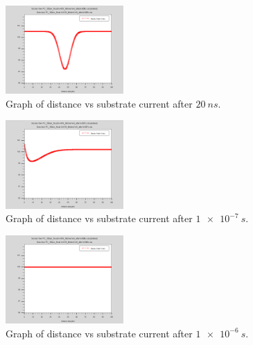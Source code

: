 \documentclass[12pt]{article}
\begin{document}
\begin{figure}[H]
  \centering
  \includegraphics[width=0.4\textwidth]{PC_100um_Nsub1e+015_lifetime1e-6_after2e-008s}
  \caption{Graph of distance vs substrate current after $\SI{20}{ns}$.}
  \label{fig:lifetime1e-6_after2e-008s}
\end{figure}
\begin{figure}[H]
  \centering
  \includegraphics[width=0.4\textwidth]{PC_100um_Nsub1e+015_lifetime1e-6_after1e-007s}
  \caption{Graph of distance vs substrate current after $\SI{1e-7}{s}$.}
  \label{fig:lifetime1e-6_after1e-007s}
\end{figure}
\begin{figure}[H]
  \centering
  \includegraphics[width=0.4\textwidth]{PC_100um_Nsub1e+015_lifetime1e-6_after1e-006s}
  \caption{Graph of distance vs substrate current after $\SI{1e-6}{s}$.}
  \label{fig:lifetime1e-6_after1e-006s}
\end{figure}



\end{document}
